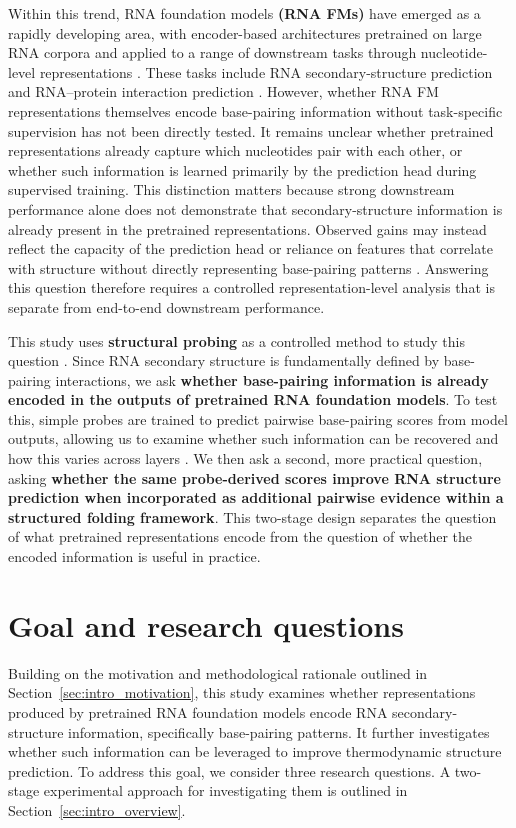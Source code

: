 \documentclass[logo,bsc,singlespacing,parskip]{infthesis}
\begin{document}
Within this trend, RNA foundation models \textbf{(RNA FMs)} have emerged as a rapidly developing area, with encoder-based architectures pretrained on large RNA corpora and applied to a range of downstream tasks through nucleotide-level representations \citep{chen2022rnafm,yin2025ernie,penic2025rinalmo}. These tasks include RNA secondary-structure prediction \citep{wang2025depfold, zablocki2025benchmark, singh2019rna} and RNA–protein interaction prediction \citep{tahmid2025birna}. 
However, whether RNA FM representations themselves encode base-pairing information without task-specific supervision has not been directly tested. It remains unclear whether pretrained representations already capture which nucleotides pair with each other, or whether such information is learned primarily by the prediction head during supervised training.
This distinction matters because strong downstream performance alone does not demonstrate that
secondary-structure information is already present in the pretrained representations.
Observed gains may instead reflect the capacity of the prediction head or reliance on
features that correlate with structure without directly representing base-pairing patterns
\citep{hewitt2019designing}. Answering this question therefore requires a controlled
representation-level analysis that is separate from end-to-end downstream performance.

This study uses \textbf{structural probing} as a controlled method to study this question \citep{hewitt2019structural}. Since RNA secondary structure is fundamentally defined by base-pairing interactions, we ask \textbf{whether base-pairing information is already encoded in the outputs of pretrained RNA foundation models}. To test this, simple probes are trained to predict pairwise base-pairing scores from model outputs, allowing us to examine whether such information can be recovered and how this varies across layers \citep{hewitt2019structural,belinkov2022probing}. We then ask a second, more practical question, asking \textbf{whether the same probe-derived scores improve RNA structure prediction when incorporated as additional pairwise evidence within a structured folding framework}. This two-stage design separates the
question of what pretrained representations encode from the question of
whether the encoded information is useful in practice.

\section{Goal and research questions}\label{sec:intro_goal_rq}
Building on the motivation and methodological rationale outlined in Section~\ref{sec:intro_motivation}, this study examines whether representations produced by pretrained RNA foundation models encode RNA secondary-structure information, specifically base-pairing patterns. It further investigates whether such information can be leveraged to improve thermodynamic structure prediction.
To address this goal, we consider three research questions. A two-stage experimental approach for investigating them is outlined in Section~\ref{sec:intro_overview}.
\end{document}
